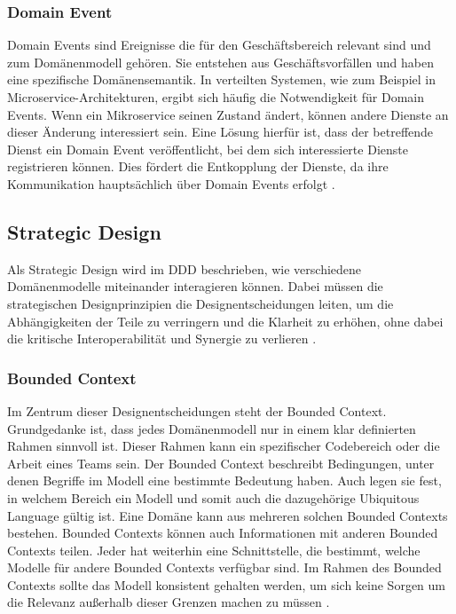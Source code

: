 {\subsubsection{Domain Event}


Domain Events sind Ereignisse die für den Geschäftsbereich relevant sind und zum Domänenmodell gehören. Sie entstehen aus Geschäftsvorfällen und haben eine spezifische Domänensemantik. In verteilten Systemen, wie zum Beispiel in Microservice-Architekturen, ergibt sich häufig die Notwendigkeit für Domain Events. Wenn ein Mikroservice seinen Zustand ändert, können andere Dienste an dieser Änderung interessiert sein. Eine Lösung hierfür ist, dass der betreffende Dienst ein Domain Event veröffentlicht, bei dem sich interessierte Dienste registrieren können. Dies fördert die Entkopplung der Dienste, da ihre Kommunikation hauptsächlich über Domain Events erfolgt \cite[S.78]{daschner} \cite{ritter}.

\pagebreak 
\subsection{Strategic Design}

Als \glqq Strategic Design\grqq{} wird im DDD beschrieben, wie verschiedene Domänenmodelle miteinander interagieren können. Dabei müssen die strategischen Designprinzipien die Designentscheidungen leiten, um die Abhängigkeiten der Teile zu verringern und die Klarheit zu erhöhen, ohne dabei die kritische Interoperabilität und Synergie zu verlieren \cite[S. 45]{wolff} \cite[S. 334]{evans}.

\subsubsection{Bounded Context}

Im Zentrum dieser Designentscheidungen steht der \glqq Bounded Context\grqq{}. Grundgedanke ist, dass jedes Domänenmodell nur in einem klar definierten Rahmen sinnvoll ist. Dieser Rahmen kann ein spezifischer Codebereich oder die Arbeit eines Teams sein. Der Bounded Context beschreibt Bedingungen, unter denen Begriffe im Modell eine bestimmte Bedeutung haben. Auch legen sie fest, in welchem Bereich ein Modell und somit auch die dazugehörige Ubiquitous Language gültig ist. Eine Domäne kann aus mehreren solchen Bounded Contexts bestehen. Bounded Contexts können auch Informationen mit anderen Bounded Contexts teilen. Jeder hat weiterhin eine Schnittstelle, die bestimmt, welche Modelle für andere Bounded Contexts verfügbar sind. Im Rahmen des Bounded Contexts sollte das Modell konsistent gehalten werden, um sich keine Sorgen um die Relevanz außerhalb dieser Grenzen machen zu müssen \cite[S. 45]{wolff} \cite[S.57]{newman} \cite[S. 335 - 340]{evans} \cite[S.64-65]{dowalil}.

}
